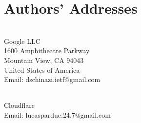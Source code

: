 \documentclass{article}
\begin{document}
\section*{Authors' Addresses}

\begin{description}[style=unboxed, leftmargin=0cm]
\item[David Schinazi]~\\
Google LLC\\
1600 Amphitheatre Parkway\\
Mountain View, CA 94043\\
United States of America\\
Email: dschinazi.ietf@gmail.com

\item[Lucas Pardue]~\\
Cloudflare\\
Email: lucaspardue.24.7@gmail.com
\end{description}
\end{document}

